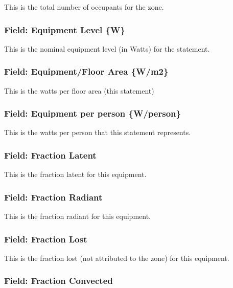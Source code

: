 This is the total number of occupants for the zone.

\subsubsection{Field: Equipment Level \{W\}}\label{field-equipment-level-w-1}

This is the nominal equipment level (in Watts) for the statement.

\subsubsection{Field: Equipment/Floor Area \{W/m2\}}\label{field-equipmentfloor-area-wm2-1}

This is the watts per floor area (this statement)

\subsubsection{Field: Equipment per person \{W/person\}}\label{field-equipment-per-person-wperson-1}

This is the watts per person that this statement represents.

\subsubsection{Field: Fraction Latent}\label{field-fraction-latent-1}

This is the fraction latent for this equipment.

\subsubsection{Field: Fraction Radiant}\label{field-fraction-radiant-3}

This is the fraction radiant for this equipment.

\subsubsection{Field: Fraction Lost}\label{field-fraction-lost-1}

This is the fraction lost (not attributed to the zone) for this equipment.

\subsubsection{Field: Fraction Convected}\label{field-fraction-convected-3}

